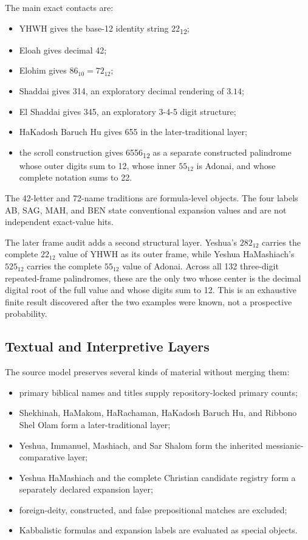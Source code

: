The main exact contacts are:

\begin{itemize}
\item YHWH gives the base-12 identity string 22\textsubscript{12};
\item Eloah gives decimal 42;
\item Elohim gives $86_{10}=72_{12}$;
\item Shaddai gives 314, an exploratory decimal rendering of $3.14$;
\item El Shaddai gives 345, an exploratory 3-4-5 digit structure;
\item HaKadosh Baruch Hu gives 655 in the later-traditional layer;
\item the scroll construction gives 6556\textsubscript{12} as a separate constructed palindrome whose outer digits sum to 12, whose inner $55_{12}$ is Adonai, and whose complete notation sums to 22.
\end{itemize}

The 42-letter and 72-name traditions are formula-level objects. The four labels AB, SAG, MAH, and BEN state conventional expansion values and are not independent exact-value hits.

The later frame audit adds a second structural layer. Yeshua's $282_{12}$ carries the complete $22_{12}$ value of YHWH as its outer frame, while Yeshua HaMashiach's $525_{12}$ carries the complete $55_{12}$ value of Adonai. Across all 132 three-digit repeated-frame palindromes, these are the only two whose center is the decimal digital root of the full value and whose digits sum to 12. This is an exhaustive finite result discovered after the two examples were known, not a prospective probability.

\subsection{Textual and Interpretive Layers}

The source model preserves several kinds of material without merging them:

\begin{itemize}
\item primary biblical names and titles supply repository-locked primary counts;
\item Shekhinah, HaMakom, HaRachaman, HaKadosh Baruch Hu, and Ribbono Shel Olam form a later-traditional layer;
\item Yeshua, Immanuel, Mashiach, and Sar Shalom form the inherited messianic-comparative layer;
\item Yeshua HaMashiach and the complete Christian candidate registry form a separately declared expansion layer;
\item foreign-deity, constructed, and false prepositional matches are excluded;
\item Kabbalistic formulas and expansion labels are evaluated as special objects.
\end{itemize}

